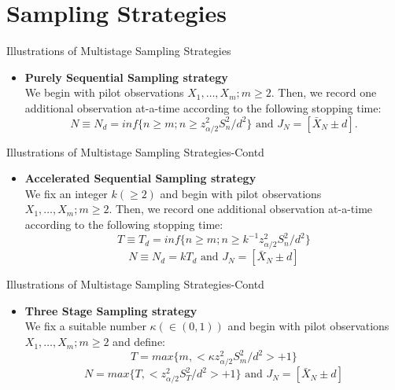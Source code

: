 \documentclass [xcolor=svgnames, t] {beamer}
\begin{document}
\section{Sampling Strategies}
\begin{frame}{Illustrations of Multistage Sampling Strategies}
  \vspace{5mm}
    \begin{itemize}
    \item \textbf{Purely Sequential Sampling strategy}
\\ We begin with pilot observations $X_1,\dots ,X_m; m\ge 2$. Then, we record one additional observation 
at-a-time according to the following stopping time:
\begin{equation*}
    N \equiv N_d=inf\{ n \ge m; n \ge z^2_{\alpha/2}S_n^2/d^2 \}  \textrm{ and }  J_N=[\bar{X}_N \pm d].
\end{equation*}
    \end{itemize}
\end{frame}
\begin{frame}{Illustrations of Multistage Sampling Strategies-Contd}
  \vspace{5mm}
    \begin{itemize}
 \item \textbf{Accelerated Sequential Sampling strategy}\\
We fix an integer $k(\geq 2)$ and begin with pilot observations $X_1,\dots ,X_m; m\ge 2$. Then, we record 
one additional observation at-a-time according to the following stopping time:        
        $$ T \equiv T_d=inf\{ n \ge m; n \ge k^{-1}z^2_{\alpha/2}S_n^2/d^2 \} $$ 
        $$ N \equiv N_d = kT_d  \text{ and } J_N=[\bar{X}_N \pm d] $$
    \end{itemize}
\end{frame}
\begin{frame}{Illustrations of Multistage Sampling Strategies-Contd}
  \vspace{5mm}
    \begin{itemize}
 
\item \textbf{Three Stage Sampling strategy}\\
We fix a suitable number $\kappa(\in (0,1))$ and begin with pilot observations $X_1,\dots ,X_m; m\ge 2$ and define:
        $$ T =max\{  m,  <\kappa z^2_{\alpha/2}S_m^2/d^2 >+1\} $$ 
        $$ N =max \{ T,  <z^2_{\alpha/2}S_T^2/d^2 >+1\}  \text{ and } J_N=[\bar{X}_N \pm d] $$
    \end{itemize}
\end{frame}
\end{document}
